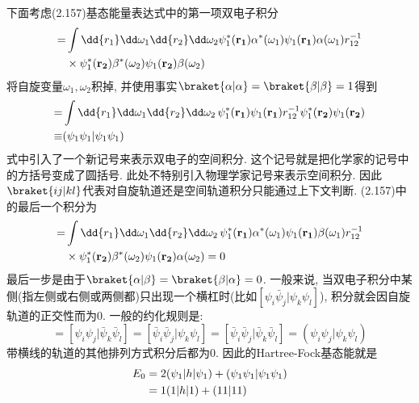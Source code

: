 下面考虑(2.157)基态能量表达式中的第一项双电子积分
\begin{align}
[{\psi_1\psi_1|\bar{\psi}_1\bar{\psi}_1}] = 
& \int\dd{r_1}\dd\omega_1\dd{r_2}\dd\omega_2\psi_1^*(\mathbf{r_1})\alpha^*(\omega_1)\psi_1(\mathbf{r_1})\alpha(\omega_1) r_{12}^{-1}\notag\\
&\times \psi_1^*(\mathbf{r_2})\beta^*(\omega_2)\psi_1(\mathbf{r_2})\beta(\omega_2)
\end{align}
将自旋变量$\omega_1,\omega_2$积掉,
并使用事实$\braket{\alpha|\alpha}=\braket{\beta|\beta}=1$得到
\begin{align}
[{\psi_1\psi_1|\bar{\psi}_1\bar{\psi}_1}] = & \int\dd{r_1}\dd\omega_1\dd{r_2}\dd\omega_2\,\psi_1^*(\mathbf{r_1})\psi_1(\mathbf{r_1}) r_{12}^{-1}\psi_1^*(\mathbf{r_2})\psi_1(\mathbf{r_2})\notag\\
\equiv  &  (\psi_1\psi_1|\psi_1\psi_1) 
\end{align}
式中引入了一个新记号来表示双电子的空间积分. 
这个记号就是把化学家的记号中的方括号变成了圆括号. 
此处不特别引入物理学家记号来表示空间积分. 
因此$\braket{ij|kl}$代表对自旋轨道还是空间轨道积分只能通过上下文判断. 
(2.157)中的最后一个积分为
\begin{align}
[{\psi_1\bar{\psi}_1|\bar{\psi}_1\psi_1}] = 
& \int\dd{r_1}\dd\omega_1\dd{r_2}\dd\omega_2\, \psi_1^*(\mathbf{r_1})\alpha^*(\omega_1)\psi_1(\mathbf{r_1})\beta(\omega_1)r_{12}^{-1}\notag\\
& \times \psi_1^*(\mathbf{r_2})\beta^*(\omega_2)\psi_1(\mathbf{r_2})\alpha(\omega_2) = 0
\end{align} 
最后一步是由于$\braket{\alpha|\beta}=\braket{\beta|\alpha} = 0$. 
一般来说, 
当双电子积分中某侧(指左侧或右侧或两侧都)只出现一个横杠时(比如$[\psi_i\bar{\psi}_j|\psi_k\psi_l]$), 
积分就会因自旋轨道的正交性而为0. 
一般的约化规则是:
\begin{equation}
[\psi_i\psi_j|\psi_k\psi_l] = 
[\psi_i\psi_j|\bar{\psi}_k\bar{\psi}_l] = [\bar{\psi}_i\bar{\psi}_j|\psi_k\psi_l] = [\bar{\psi}_i\bar{\psi}_j|\bar{\psi}_k\bar{\psi}_l] = (\psi_i\psi_j|\psi_k\psi_l)
\end{equation}
带横线的轨道的其他排列方式积分后都为0. 
因此的Hartree-Fock基态能就是
\begin{align}
E_0 & = 2(\psi_1|h|\psi_1) + (\psi_1\psi_1|\psi_1\psi_1) \notag\\
    & = 1(1|h|1) + (11|11)
\end{align} 
